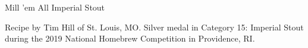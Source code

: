 \begin{recipe}{Mill 'em All Imperial Stout}

\begin{aboutblock}
Recipe by Tim Hill of St. Louis, MO. Silver medal in Category 15: Imperial Stout
during the 2019 National Homebrew Competition in Providence, RI. \sourceaha
\end{aboutblock}


\begin{methodandtiming}
 
\begin{mashsteps}
\end{mashsteps}

\begin{fermentationsteps}
\end{fermentationsteps}

\end{methodandtiming}

\recipebreak

\begin{ingredientsblock}

\begin{malts}
\end{malts}

\begin{hops}
\end{hops}


\end{ingredientsblock}

\end{recipe}

